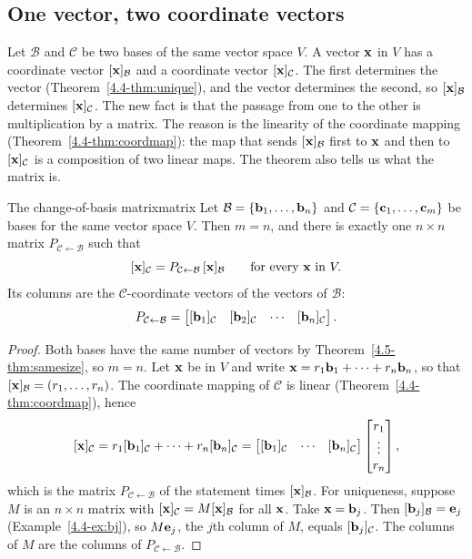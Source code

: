 \documentclass[11pt]{article}
\begin{document}
\subsection*{One vector, two coordinate vectors}

Let $\mathcal{B}$ and $\mathcal{C}$ be two bases of the same vector space $V$. A vector $\mathbf{x}$ in $V$ has a coordinate vector $[\mathbf{x}]_{\mathcal{B}}$ and a coordinate vector $[\mathbf{x}]_{\mathcal{C}}$. The first determines the vector (Theorem~\ref{4.4-thm:unique}), and the vector determines the second, so $[\mathbf{x}]_{\mathcal{B}}$ determines $[\mathbf{x}]_{\mathcal{C}}$. The new fact is that the passage from one to the other is multiplication by a matrix. The reason is the linearity of the coordinate mapping (Theorem~\ref{4.4-thm:coordmap}): the map that sends $[\mathbf{x}]_{\mathcal{B}}$ first to $\mathbf{x}$ and then to $[\mathbf{x}]_{\mathcal{C}}$ is a composition of two linear maps. The theorem also tells us what the matrix is.

\begin{thm}{The change-of-basis matrix}{matrix}
Let $\mathcal{B}=\{\mathbf{b}_1,\dots,\mathbf{b}_n\}$ and $\mathcal{C}=\{\mathbf{c}_1,\dots,\mathbf{c}_m\}$ be bases for the same vector space $V$. Then $m=n$, and there is exactly one $n\times n$ matrix $P_{\mathcal{C}\leftarrow\mathcal{B}}$ such that
\[
[\mathbf{x}]_{\mathcal{C}}=P_{\mathcal{C}\leftarrow\mathcal{B}}\,[\mathbf{x}]_{\mathcal{B}}\qquad\text{for every }\mathbf{x}\text{ in }V.
\]
Its columns are the $\mathcal{C}$-coordinate vectors of the vectors of $\mathcal{B}$:
\[
P_{\mathcal{C}\leftarrow\mathcal{B}}=\begin{bmatrix}[\mathbf{b}_1]_{\mathcal{C}}&[\mathbf{b}_2]_{\mathcal{C}}&\cdots&[\mathbf{b}_n]_{\mathcal{C}}\end{bmatrix}.
\]
\end{thm}

\begin{proof}
Both bases have the same number of vectors by Theorem~\ref{4.5-thm:samesize}, so $m=n$. Let $\mathbf{x}$ be in $V$ and write $\mathbf{x}=r_1\mathbf{b}_1+\cdots+r_n\mathbf{b}_n$, so that $[\mathbf{x}]_{\mathcal{B}}=(r_1,\dots,r_n)$. The coordinate mapping of $\mathcal{C}$ is linear (Theorem~\ref{4.4-thm:coordmap}), hence
\[
[\mathbf{x}]_{\mathcal{C}}=r_1[\mathbf{b}_1]_{\mathcal{C}}+\cdots+r_n[\mathbf{b}_n]_{\mathcal{C}}=\begin{bmatrix}[\mathbf{b}_1]_{\mathcal{C}}&\cdots&[\mathbf{b}_n]_{\mathcal{C}}\end{bmatrix}\begin{bmatrix}r_1\\\vdots\\r_n\end{bmatrix},
\]
which is the matrix $P_{\mathcal{C}\leftarrow\mathcal{B}}$ of the statement times $[\mathbf{x}]_{\mathcal{B}}$. For uniqueness, suppose $M$ is an $n\times n$ matrix with $[\mathbf{x}]_{\mathcal{C}}=M[\mathbf{x}]_{\mathcal{B}}$ for all $\mathbf{x}$. Take $\mathbf{x}=\mathbf{b}_j$. Then $[\mathbf{b}_j]_{\mathcal{B}}=\mathbf{e}_j$ (Example~\ref{4.4-ex:bj}), so $M\mathbf{e}_j$, the $j$th column of $M$, equals $[\mathbf{b}_j]_{\mathcal{C}}$. The columns of $M$ are the columns of $P_{\mathcal{C}\leftarrow\mathcal{B}}$.
\end{proof}
\end{document}
